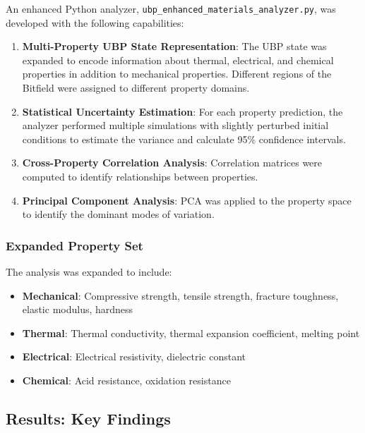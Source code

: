 \documentclass[11pt,a4paper]{article}
\begin{document}
An enhanced Python analyzer, \texttt{ubp\_enhanced\_materials\_analyzer.py}, was developed with the following capabilities:

\begin{enumerate}
    \item \textbf{Multi-Property UBP State Representation}: The UBP state was expanded to encode information about thermal, electrical, and chemical properties in addition to mechanical properties. Different regions of the Bitfield were assigned to different property domains.
    
    \item \textbf{Statistical Uncertainty Estimation}: For each property prediction, the analyzer performed multiple simulations with slightly perturbed initial conditions to estimate the variance and calculate 95\% confidence intervals.
    
    \item \textbf{Cross-Property Correlation Analysis}: Correlation matrices were computed to identify relationships between properties.
    
    \item \textbf{Principal Component Analysis}: PCA was applied to the property space to identify the dominant modes of variation.
\end{enumerate}

\subsubsection{Expanded Property Set}

The analysis was expanded to include:

\begin{itemize}
    \item \textbf{Mechanical}: Compressive strength, tensile strength, fracture toughness, elastic modulus, hardness
    \item \textbf{Thermal}: Thermal conductivity, thermal expansion coefficient, melting point
    \item \textbf{Electrical}: Electrical resistivity, dielectric constant
    \item \textbf{Chemical}: Acid resistance, oxidation resistance
\end{itemize}

\subsection{Results: Key Findings}
\end{document}
